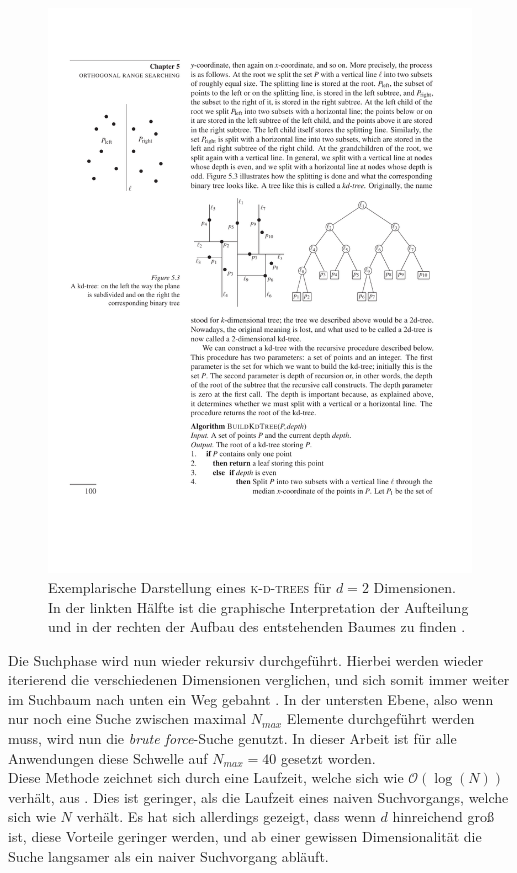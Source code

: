 \begin{figure}[h]
    \centering
    \includegraphics[width = 0.9 \textwidth]{figures/illustrations/kdtree.pdf}
    \caption{Exemplarische Darstellung eines \textsc{k-d-trees} für $d=2$ Dimensionen. In der linkten Hälfte ist die graphische Interpretation der Aufteilung und in der rechten der Aufbau des entstehenden Baumes zu finden \cite{de2000computational}.}
    \label{fig:kdtree}
\end{figure}

Die Suchphase wird nun wieder rekursiv durchgeführt. Hierbei werden wieder iterierend die verschiedenen Dimensionen verglichen, und sich somit immer weiter im Suchbaum nach unten ein Weg gebahnt \cite{de2000computational}. In der untersten Ebene, also wenn nur noch eine Suche zwischen maximal $N_{max}$ Elemente durchgeführt werden muss, wird nun die \textit{brute force}-Suche genutzt. In dieser Arbeit ist für alle Anwendungen diese Schwelle auf $N_{max} = 40$ gesetzt worden.\\

Diese Methode zeichnet sich durch eine Laufzeit, welche sich wie $\mathcal{O}(\log(N))$ verhält, aus \cite{bentley1975multidimensional}. Dies ist geringer, als die Laufzeit eines naiven Suchvorgangs, welche sich wie $N$ verhält. Es hat sich allerdings gezeigt, dass wenn $d$ hinreichend groß ist, diese Vorteile geringer werden, und ab einer gewissen Dimensionalität die Suche langsamer als ein naiver Suchvorgang abläuft.\\

